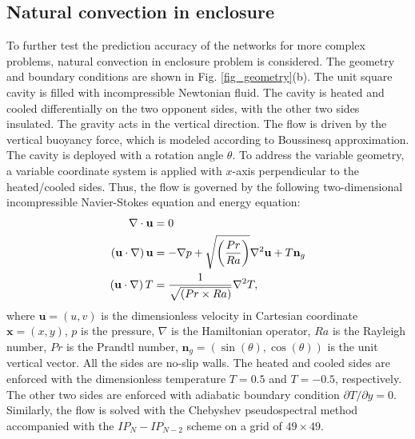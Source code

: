 \documentclass[preprint, 10pt]{elsarticle}
\begin{document}
\subsection{Natural convection in enclosure}
To further test the prediction accuracy of the networks for more complex problems, natural convection in enclosure problem is considered. The geometry and boundary conditions are shown in Fig. \ref{fig_geometry}(b). The unit square cavity is filled with incompressible Newtonian fluid. The cavity is heated and cooled differentially on the two opponent sides, with the other two sides insulated. The gravity acts in the vertical direction. The flow is driven by the vertical buoyancy force, which is modeled according to Boussinesq approximation. The cavity is deployed with a rotation angle $\theta$. To address the variable geometry, a variable coordinate system is applied with $x$-axis perpendicular to the heated/cooled sides.
Thus, the flow is governed by the following two-dimensional incompressible Navier-Stokes equation and energy equation:
\begin{equation}
\begin{aligned}
\nabla  \cdot {\bf{u}} &= 0 \\
\left( {{\bf{u}} \cdot \nabla } \right){\bf{u}} &=  - \nabla p + \sqrt{\left(\frac{Pr}{Ra}\right)}{\nabla ^2}{\bf{u}} + T\mathbf{n}_g \\
\left( {{\bf{u}} \cdot \nabla } \right)T        &=  \frac{1}{\sqrt{\left({Pr}\times{Ra}\right)}}{\nabla ^2}T,
\end{aligned}
\label{eq_GoverningEqsNaturalConvection}
\end{equation}
where $\mathbf{u}=(u,v)$ is the dimensionless velocity in Cartesian coordinate $\mathbf{x}=(x,y)$, $p$ is the pressure, $\nabla$ is the  Hamiltonian operator, $Ra$ is the Rayleigh number, $Pr$ is the Prandtl number, $\mathbf{n}_g=\left(\sin(\theta),\cos(\theta) \right)$ is the unit vertical vector. All the sides are no-slip walls. The heated and cooled sides are enforced with the dimensionless temperature $T=0.5$ and $T=-0.5$, respectively. The other two sides are enforced with adiabatic boundary condition $\partial T / \partial y=0$.
Similarly, the flow is solved with the Chebyshev pseudospectral method accompanied with the $IP_{N}-IP_{N-2}$ scheme on a grid of $49 \times 49$.
\end{document}
